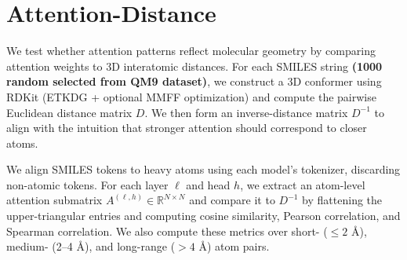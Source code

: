 \section{Attention-Distance}
\label{app:attention}

We test whether attention patterns reflect molecular geometry by comparing
attention weights to 3D interatomic distances. For each SMILES string \textbf{(1000 random selected from QM9 dataset)}, we construct
a 3D conformer using RDKit (ETKDG + optional MMFF optimization) and compute the
pairwise Euclidean distance matrix $D$. We then form an inverse-distance matrix
$D^{-1}$ to align with the intuition that stronger attention should correspond to
closer atoms.

We align SMILES tokens to heavy atoms using each model’s tokenizer, discarding
non-atomic tokens. For each layer $\ell$ and head $h$, we extract an atom-level
attention submatrix $A^{(\ell,h)} \in \mathbb{R}^{N \times N}$ and compare it to
$D^{-1}$ by flattening the upper-triangular entries and computing cosine similarity,
Pearson correlation, and Spearman correlation. We also compute these metrics over
short- ($\leq 2$ \AA), medium- (2–4 \AA), and long-range ($>4$ \AA) atom pairs.
